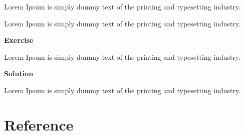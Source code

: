 \documentclass[
]{book}
\newenvironment{rmdexer}{
    \par\noindent
    \textbf{\color{MPIRed}Exercise} \itshape
}{\par}
\newenvironment{rmdsol}{
    \par\noindent
    \textbf{\color{MPIPacificCoast}Solution} \itshape
}{\par}
\begin{document}
\begin{Proof}{}{}
Lorem Ipsum is simply dummy text of the printing and typesetting industry.

\end{Proof}

\begin{Solution}{}{}
Lorem Ipsum is simply dummy text of the printing and typesetting industry.

\end{Solution}

\begin{rmdexer}
Lorem Ipsum is simply dummy text of the printing and typesetting industry.

\end{rmdexer}

\begin{rmdsol}
Lorem Ipsum is simply dummy text of the printing and typesetting industry.

\end{rmdsol}

\hypertarget{reference}{%
\chapter{Reference}\label{reference}}
\end{document}
